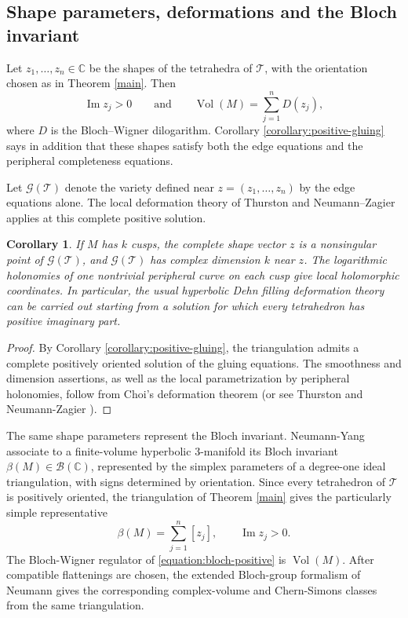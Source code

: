 \documentclass[oneside,a4paper,12pt]{article}
\newcommand{\T}{\mathcal T}
\newcommand{\Vol}{\operatorname{Vol}}
\theoremstyle{plain}
\newtheorem{corollary}[theorem]{Corollary}
\theoremstyle{definition}
\theoremstyle{remark}
\numberwithin{equation}{section}
\begin{document}
\subsection{Shape parameters, deformations and the Bloch invariant}
Let $z_1,\ldots,z_n\in\mathbb C$ be the shapes of the tetrahedra of $\T$, with the orientation chosen as in Theorem \ref{main}. Then
\begin{equation}
\operatorname{Im}z_j>0
\qquad\text{and}\qquad
\Vol(M)=\sum_{j=1}^n D(z_j),
  \nonumber \end{equation}
where $D$ is the Bloch--Wigner dilogarithm. Corollary \ref{corollary:positive-gluing} says in addition that these shapes satisfy both the edge equations and the peripheral completeness equations.

Let $\mathcal G(\T)$ denote the variety defined near $z=(z_1,\ldots,z_n)$ by the edge equations alone. The local deformation theory of Thurston and Neumann--Zagier applies at this complete positive solution.

\begin{corollary}\label{corollary:NZ}
If $M$ has $k$ cusps, the complete shape vector $z$ is a nonsingular point of $\mathcal G(\T)$, and $\mathcal G(\T)$ has complex dimension $k$ near $z$. The logarithmic holonomies of one nontrivial peripheral curve on each cusp give local holomorphic coordinates. In particular, the usual hyperbolic Dehn filling deformation theory can be carried out starting from a solution for which every tetrahedron has positive imaginary part.
\end{corollary}

\begin{proof}
By Corollary \ref{corollary:positive-gluing}, the triangulation admits a complete positively oriented
solution of the gluing equations. The smoothness and dimension assertions, as well as the local parametrization by peripheral holonomies, follow
from Choi's deformation theorem \cite{Choi} (or see Thurston \cite{Thurston} and Neumann-Zagier \cite{NZ}).
\end{proof}

The same shape parameters represent the Bloch invariant. Neumann-Yang \cite{NY} associate to a finite-volume hyperbolic $3$-manifold its Bloch invariant $\beta(M)\in\mathcal B(\mathbb C)$, represented by the simplex parameters of a degree-one ideal triangulation, with signs determined by orientation. Since every tetrahedron of $\T$ is positively oriented, the triangulation of Theorem \ref{main} gives the particularly simple representative
\begin{equation}\label{equation:bloch-positive}
\beta(M)=\sum_{j=1}^n [z_j],
\qquad \operatorname{Im}z_j>0.
\end{equation}
The Bloch-Wigner regulator of \eqref{equation:bloch-positive} is $\Vol(M)$. After compatible flattenings are chosen, the extended Bloch-group formalism of Neumann \cite{NeumannExtended} gives the corresponding complex-volume and Chern-Simons classes from the same triangulation.
\end{document}

